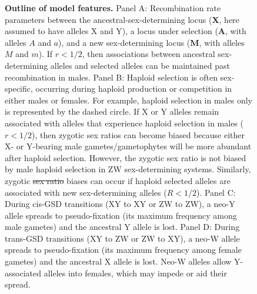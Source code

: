 \documentclass[10pt,letterpaper]{article}
\providecommand{\DIFaddtex}[1]{{\protect\color{blue}\uwave{#1}}} %
\providecommand{\DIFdeltex}[1]{{\protect\color{red}\sout{#1}}}                      %
\providecommand{\DIFaddFL}[1]{\DIFadd{#1}} %
\providecommand{\DIFdelFL}[1]{\DIFdel{#1}} %
\providecommand{\DIFaddbeginFL}{} %
\providecommand{\DIFaddendFL}{} %
\providecommand{\DIFdelbeginFL}{} %
\providecommand{\DIFdelendFL}{} %
\providecommand{\DIFadd}[1]{\texorpdfstring{\DIFaddtex{#1}}{#1}} %
\providecommand{\DIFdel}[1]{\texorpdfstring{\DIFdeltex{#1}}{}} %
\newcommand{\DIFscaledelfig}{0.5}
\newlength{\DIFdelgraphicswidth} %
\newlength{\DIFdelgraphicsheight} %
\newcommand{\DIFaddincludegraphics}[2][]{{\color{blue}\fbox{\DIFOincludegraphics[#1]{#2}}}} %
\newcommand{\DIFdelincludegraphics}[2][]{%
\sbox{\DIFdelgraphicsbox}{\DIFOincludegraphics[#1]{#2}}%
\settoboxwidth{\DIFdelgraphicswidth}{\DIFdelgraphicsbox} %
\settoboxtotalheight{\DIFdelgraphicsheight}{\DIFdelgraphicsbox} %
\scalebox{\DIFscaledelfig}{%
\parbox[b]{\DIFdelgraphicswidth}{\usebox{\DIFdelgraphicsbox}\\[-\baselineskip] \rule{\DIFdelgraphicswidth}{0em}}\llap{\resizebox{\DIFdelgraphicswidth}{\DIFdelgraphicsheight}{%
\setlength{\unitlength}{\DIFdelgraphicswidth}%
\begin{picture}(1,1)%
\thicklines\linethickness{2pt} %
{\color[rgb]{1,0,0}\put(0,0){\framebox(1,1){}}}%
{\color[rgb]{1,0,0}\put(0,0){\line( 1,1){1}}}%
{\color[rgb]{1,0,0}\put(0,1){\line(1,-1){1}}}%
\end{picture}%
}\hspace*{3pt}}} %
} %
\DeclareRobustCommand{\DIFaddbeginFL}{\DIFOaddbeginFL \let\includegraphics\DIFaddincludegraphics} %
\DeclareRobustCommand{\DIFaddendFL}{\DIFOaddendFL \let\includegraphics\DIFOincludegraphics} %
\DeclareRobustCommand{\DIFdelbeginFL}{\DIFOdelbeginFL \let\includegraphics\DIFdelincludegraphics} %
\DeclareRobustCommand{\DIFdelendFL}{\DIFOaddendFL \let\includegraphics\DIFOincludegraphics} %
\begin{document}
\begin{figure}[!h]
\caption{
{\bf Outline of model features.}
Panel A: Recombination rate parameters between the ancestral-sex-determining locus ($\mathbf{X}$, here assumed to have alleles X and Y), a locus under selection ($\mathbf{A}$, with alleles $A$ and $a$), and a new sex-determining locus ($\mathbf{M}$, with alleles $M$ and $m$). 
If $r<1/2$, then associations between ancestral sex-determining alleles and selected alleles can be maintained past recombination in males. 
Panel B: Haploid selection is often sex-specific, occurring during haploid production or competition in either males or females. 
For example, haploid selection in males only is represented by the dashed circle.  
If X or Y alleles remain associated with alleles that experience haploid selection in males ($r<1/2$), then zygotic sex ratios can become biased because either X- or Y-bearing male gametes/gametophytes will be more abundant after haploid selection. 
However, the zygotic sex ratio is not biased by male haploid selection in ZW sex-determining systems. 
Similarly, zygotic \DIFdelbeginFL \DIFdelFL{sex ratio }\DIFdelendFL \DIFaddbeginFL \DIFaddFL{sex-ratio }\DIFaddendFL biases can occur if haploid selected alleles are associated with new sex-determining alleles ($R<1/2$). 
Panel C: During cis-GSD transitions (XY to XY or ZW to ZW), a neo-Y allele spreads to pseudo-fixation (its maximum frequency among male gametes) and the ancestral Y allele is lost. 
Panel D: During trans-GSD transitions (XY to ZW or ZW to XY), a neo-W allele spreads to pseudo-fixation (its maximum frequency among female gametes) and the ancestral X allele is lost. 
Neo-W alleles allow Y-associated alleles into females, which may impede or aid their spread. 
}
\label{fig:model_outline}
\end{figure}
\end{document}
